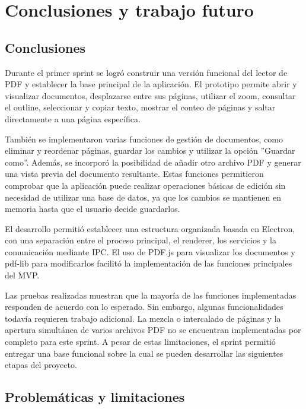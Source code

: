 \chapter{Conclusiones y trabajo futuro}
\section{Conclusiones}
Durante el primer sprint se logró construir una versión funcional del lector de PDF y establecer la base principal de la aplicación. El prototipo permite abrir y visualizar documentos, desplazarse entre sus páginas, utilizar el zoom, consultar el outline, seleccionar y copiar texto, mostrar el conteo de páginas
y saltar directamente a una página específica.

También se implementaron varias funciones de gestión de documentos, como eliminar y reordenar páginas, guardar los cambios y utilizar la opción ''Guardar como''. Además, se incorporó la posibilidad de añadir otro archivo PDF y generar una vista previa del documento resultante. Estas funciones permitieron comprobar que la aplicación puede realizar operaciones básicas de edición sin necesidad de utilizar una base de datos, ya que los cambios se mantienen en memoria hasta que el usuario decide guardarlos.

El desarrollo permitió establecer una estructura organizada basada en Electron, con una separación entre el proceso principal, el renderer, los servicios y la comunicación mediante IPC. El uso de PDF.js para visualizar los documentos y
pdf-lib para modificarlos facilitó la implementación de las funciones principales del MVP.

Las pruebas realizadas muestran que la mayoría de las funciones implementadas responden de acuerdo con lo esperado. Sin embargo, algunas funcionalidades todavía requieren trabajo adicional. La mezcla o intercalado de páginas y la apertura simultánea de varios archivos PDF no se encuentran implementadas por completo para este sprint. A pesar de estas limitaciones, el sprint permitió entregar una base funcional sobre la cual se pueden desarrollar las siguientes etapas del proyecto.


\section{Problemáticas y limitaciones}


